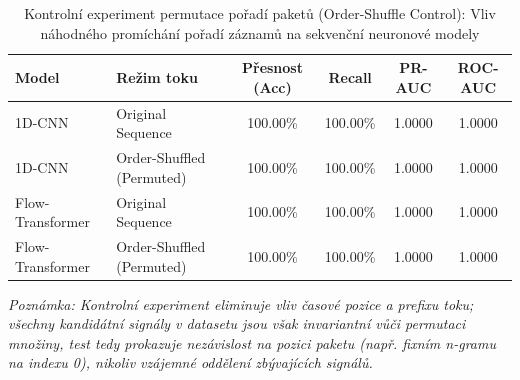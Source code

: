 \begin{table}[htbp]
\centering
\caption{Kontrolní experiment permutace pořadí paketů (Order-Shuffle Control): Vliv náhodného promíchání pořadí záznamů na sekvenční neuronové modely}
\label{tab:order_shuffle}
\begin{tabular}{llcccc}
\hline
\textbf{Model} & \textbf{Režim toku} & \textbf{Přesnost (Acc)} & \textbf{Recall} & \textbf{PR-AUC} & \textbf{ROC-AUC} \\
\hline
1D-CNN & Original Sequence & 100.00\% & 100.00\% & 1.0000 & 1.0000 \\
1D-CNN & Order-Shuffled (Permuted) & 100.00\% & 100.00\% & 1.0000 & 1.0000 \\
Flow-Transformer & Original Sequence & 100.00\% & 100.00\% & 1.0000 & 1.0000 \\
Flow-Transformer & Order-Shuffled (Permuted) & 100.00\% & 100.00\% & 1.0000 & 1.0000 \\
\hline
\end{tabular}
\par\vspace{0.15cm}\footnotesize\textit{Poznámka: Kontrolní experiment eliminuje vliv časové pozice a prefixu toku; všechny kandidátní signály v datasetu jsou však invariantní vůči permutaci množiny, test tedy prokazuje nezávislost na pozici paketu (např. fixním n-gramu na indexu 0), nikoliv vzájemné oddělení zbývajících signálů.}
\end{table}
